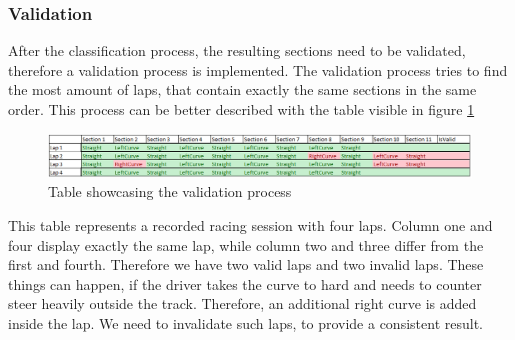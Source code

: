 \subsubsection{Validation}
After the classification process, the resulting sections need to be validated, therefore a validation process is implemented. The validation process tries to find the most amount of laps, that contain exactly the same sections in the same order. This process can be better described with the table visible in figure \ref{validation}
\begin{figure}[H]
	\centering
	\includegraphics[scale= 0.5]{Pictures/validation.png}
	\caption{Table showcasing the validation process}
	\label{validation}
\end{figure}
This table represents a recorded racing session with four laps. Column one and four display exactly the same lap, while column two and three differ from the first and fourth. Therefore we have two valid laps and two invalid laps. These things can happen, if the driver takes the curve to hard and needs to counter steer heavily outside the track. Therefore, an additional right curve is added inside the lap. We need to invalidate such laps, to provide a consistent result.
\newpage

